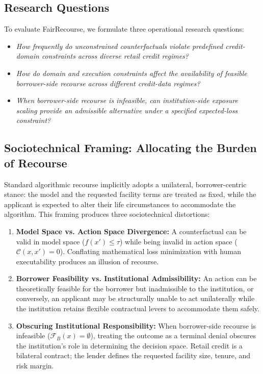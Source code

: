 \documentclass[manuscript,screen,review,anonymous]{acmart}
\begin{document}
\subsection{Research Questions}
To evaluate FairRecourse, we formulate three operational research questions:
\begin{itemize}
    \item[\textbf{RQ1:}] \emph{How frequently do unconstrained counterfactuals violate predefined credit-domain constraints across diverse retail credit regimes?}
    \item[\textbf{RQ2:}] \emph{How do domain and execution constraints affect the availability of feasible borrower-side recourse across different credit-data regimes?}
    \item[\textbf{RQ3:}] \emph{When borrower-side recourse is infeasible, can institution-side exposure scaling provide an admissible alternative under a specified expected-loss constraint?}
\end{itemize}

\subsection{Sociotechnical Framing: Allocating the Burden of Recourse}
Standard algorithmic recourse implicitly adopts a unilateral, borrower-centric stance: the model and the requested facility terms are treated as fixed, while the applicant is expected to alter their life circumstances to accommodate the algorithm. This framing produces three sociotechnical distortions:
\begin{enumerate}
    \item \textbf{Model Space vs. Action Space Divergence:} A counterfactual can be valid in model space ($f(x') \le \tau$) while being invalid in action space ($\mathcal{C}(x, x') = 0$). Conflating mathematical loss minimization with human executability produces an illusion of recourse.
    \item \textbf{Borrower Feasibility vs. Institutional Admissibility:} An action can be theoretically feasible for the borrower but inadmissible to the institution, or conversely, an applicant may be structurally unable to act unilaterally while the institution retains flexible contractual levers to accommodate them safely.
    \item \textbf{Obscuring Institutional Responsibility:} When borrower-side recourse is infeasible ($\mathcal{F}_B(x) = \emptyset$), treating the outcome as a terminal denial obscures the institution's role in determining the decision space. Retail credit is a bilateral contract; the lender defines the requested facility size, tenure, and risk margin. 
\end{enumerate}
\end{document}
